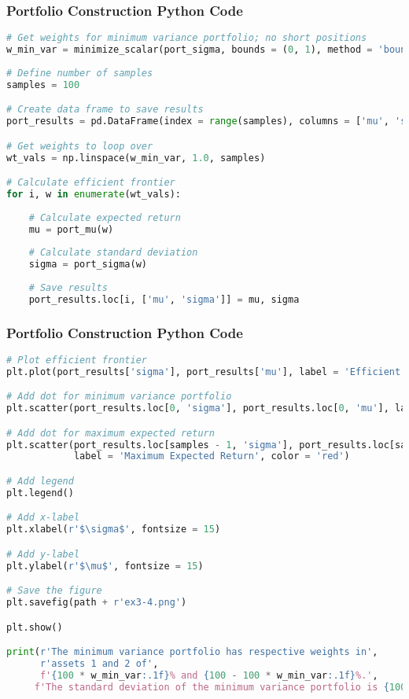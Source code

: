 \documentclass{beamer}
\begin{document}
\begin{frame}[fragile]
\frametitle{Portfolio Construction Python Code}

\begin{lstlisting}[language=Python]
# Get weights for minimum variance portfolio; no short positions
w_min_var = minimize_scalar(port_sigma, bounds = (0, 1), method = 'bounded').x
                            
# Define number of samples
samples = 100

# Create data frame to save results
port_results = pd.DataFrame(index = range(samples), columns = ['mu', 'sigma'])

# Get weights to loop over
wt_vals = np.linspace(w_min_var, 1.0, samples)

# Calculate efficient frontier
for i, w in enumerate(wt_vals):
    
    # Calculate expected return
    mu = port_mu(w)
    
    # Calculate standard deviation
    sigma = port_sigma(w)
    
    # Save results
    port_results.loc[i, ['mu', 'sigma']] = mu, sigma
\end{lstlisting}

\end{frame}

\begin{frame}[fragile]
\frametitle{Portfolio Construction Python Code}

\begin{lstlisting}[language=Python]
# Plot efficient frontier
plt.plot(port_results['sigma'], port_results['mu'], label = 'Efficient Frontier')

# Add dot for minimum variance portfolio
plt.scatter(port_results.loc[0, 'sigma'], port_results.loc[0, 'mu'], label = 'Minimum Variance', color = 'green')

# Add dot for maximum expected return
plt.scatter(port_results.loc[samples - 1, 'sigma'], port_results.loc[samples - 1, 'mu'], 
            label = 'Maximum Expected Return', color = 'red')

# Add legend
plt.legend()

# Add x-label
plt.xlabel(r'$\sigma$', fontsize = 15)

# Add y-label
plt.ylabel(r'$\mu$', fontsize = 15)

# Save the figure
plt.savefig(path + r'ex3-4.png')

plt.show()

print(r'The minimum variance portfolio has respective weights in', 
      r'assets 1 and 2 of', 
      f'{100 * w_min_var:.1f}% and {100 - 100 * w_min_var:.1f}%.',
     f'The standard deviation of the minimum variance portfolio is {100 * port_sigma(w_min_var):.1f}%.')
      \end{lstlisting}

\end{frame}
\end{document}
